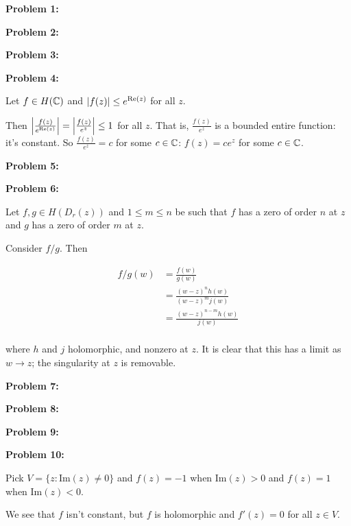 \documentclass[a4paper,12pt]{article}
\begin{document}
{\bf Problem 1:}

\shunt

{\bf Problem 2:}

\shunt

{\bf Problem 3:}

\shunt

{\bf Problem 4:}

Let $f \in H(\mathbb{C})$ and $\left\lvert f(z) \right\rvert \leq e^{\text{Re}(z)}$ for all $z$.

Then $\left\lvert \frac{f(z)}{e^{\text{Re}(z)}} \right\rvert = \left\lvert \frac{f(z)}{e^z} \right\rvert \leq 1$ for all $z$. That is, $\frac{f(z)}{e^z}$ is a bounded entire function: it's constant. So $\frac{f(z)}{e^z} = c$ for some $c \in \mathbb{C}$: $f(z) = ce^z$ for some $c \in \mathbb{C}$.

\shunt

{\bf Problem 5:}

\shunt

{\bf Problem 6:}

Let $f, g \in H(D_r(z))$ and $1 \leq m \leq n$ be such that $f$ has a zero of order $n$ at $z$ and $g$ has a zero of order $m$ at $z$.

Consider $f/g$. Then

\begin{align*}
f/g(w) &= \frac{f(w)}{g(w)}\\
&= \frac{(w-z)^nh(w)}{(w-z)^mj(w)}\\
&= \frac{(w-z)^{n-m}h(w)}{j(w)}\\
\end{align*}

where $h$ and $j$ holomorphic, and nonzero at $z$. It is clear that this has a limit as $w \to z$; the singularity at $z$ is removable.  

\shunt

{\bf Problem 7:}


\shunt

{\bf Problem 8:}

\shunt

{\bf Problem 9:}

\shunt

{\bf Problem 10:}

Pick $V = \{z: \text{Im}(z) \neq 0\}$ and $f(z) = -1$ when $\text{Im}(z) >0$ and $f(z) = 1$ when $\text{Im}(z) < 0$.

We see that $f$ isn't constant, but $f$ is holomorphic and $f'(z) = 0$ for all $z \in V$.
\end{document}
